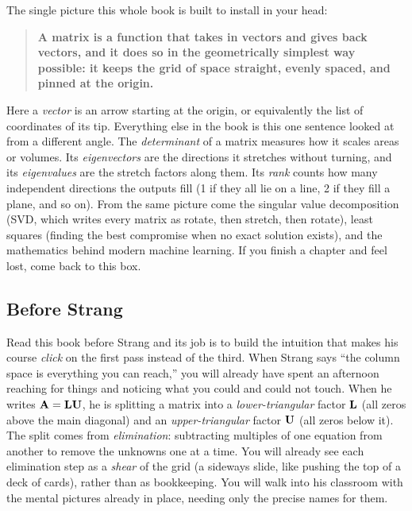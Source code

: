 \begin{intuitionbox}
The single picture this whole book is built to install in your head:
\begin{quote}
\textbf{A matrix is a function that takes in vectors and gives back vectors,
and it does so in the geometrically simplest way possible: it keeps the grid
of space straight, evenly spaced, and pinned at the origin.}
\end{quote}
Here a \emph{vector} is an arrow starting at the origin, or equivalently the list
of coordinates of its tip. Everything else in the book is this one sentence
looked at from a different angle. The \emph{determinant} of a matrix measures how
it scales areas or volumes. Its \emph{eigenvectors} are the directions it
stretches without turning, and its \emph{eigenvalues} are the stretch factors
along them. Its \emph{rank} counts how many independent directions the outputs
fill (1 if they all lie on a line, 2 if they fill a plane, and so on). From the
same picture come the singular value decomposition (SVD, which writes every matrix
as rotate, then stretch, then rotate), least squares (finding the best compromise
when no exact solution exists), and the mathematics behind modern machine
learning. If you finish a chapter and feel lost, come back to this box.
\end{intuitionbox}

\subsection*{Before Strang}

Read this book before Strang and its job is to build the intuition that makes his
course \emph{click} on the first pass instead of the third. When Strang says
``the column space is everything you can reach,'' you will already have spent an
afternoon reaching for things and noticing what you could and could not touch.
When he writes $\mathbf{A} = \mathbf{L}\mathbf{U}$, he is splitting a matrix into a
\emph{lower-triangular} factor $\mathbf{L}$ (all zeros above the main diagonal) and an
\emph{upper-triangular} factor $\mathbf{U}$ (all zeros below it). The split comes from
\emph{elimination}: subtracting multiples of one equation from another to remove
the unknowns one at a time. You will already see each elimination step as a
\emph{shear} of the grid (a sideways slide, like pushing the top of a deck of cards),
rather than as bookkeeping. You will walk into his classroom with the mental
pictures already in place, needing only the precise names for them.

